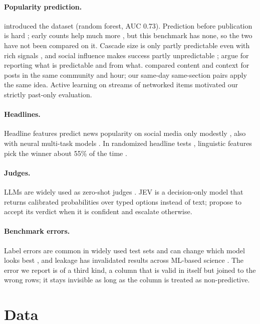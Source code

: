 \documentclass[10pt,a4paper,twocolumn]{article}
\begin{document}
\paragraph{Popularity prediction.} \citet{fernandes2015} introduced the dataset (random forest, AUC 0.73).
Prediction before publication is hard \citep{bandari2012}; early counts help much more \citep{szabo2010}, but this benchmark has none, so the two have not been compared on it.
Cascade size is only partly predictable even with rich signals \citep{cheng2014,martin2016}, and social influence
makes success partly unpredictable \citep{salganik2006}; \citet{hofman2017} argue for reporting what is
predictable and from what. \citet{hessel2017} compared content and context for posts in the same community and
hour; our same-day same-section pairs apply the same idea. Active learning on streams of networked items
\citep{yang2014wsdm,yang2014cikm} motivated our strictly past-only evaluation.
\paragraph{Headlines.} Headline features predict news popularity on social media only modestly
\citep{piotrkowicz2017}, also with neural multi-task models \citep{lamprinidis2018}. In
randomized headline tests \citep{matias2021}, linguistic features pick the winner about 55\% of the time
\citep{gligoric2021}.
\paragraph{Judges.} LLMs are widely used as zero-shot judges \citep{zheng2023judge}. JEV is a decision-only
model that returns calibrated probabilities over typed options instead of text; \citet{li2026jev} propose to
accept its verdict when it is confident and escalate otherwise.
\paragraph{Benchmark errors.} Label errors are common in widely used test sets and can change which model
looks best \citep{northcutt2021}, and leakage has invalidated results across ML-based science
\citep{kapoor2023}. The error we report is of a third kind, a column that is valid in itself but joined to the
wrong rows; it stays invisible as long as the column is treated as non-predictive.

\section{Data}
\label{sec:data}
\end{document}
